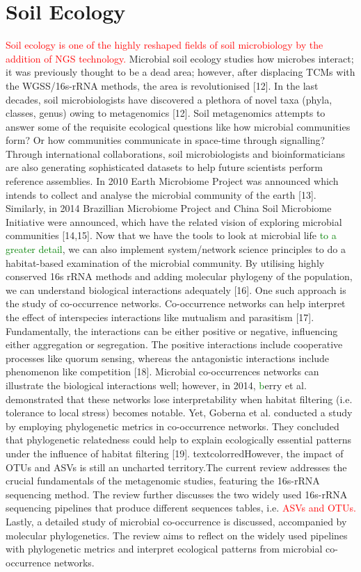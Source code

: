 \section{Soil Ecology}
\textcolor{red}{Soil ecology is one of the highly reshaped fields of soil microbiology by the addition of NGS technology.} Microbial soil ecology studies how microbes interact; it was previously thought to be a dead area; however, after displacing TCMs with the WGSS/16s-rRNA methods, the area is revolutionised [12]. In the last decades, soil microbiologists have discovered a plethora of novel taxa (phyla, classes, genus) owing to metagenomics [12]. Soil metagenomics attempts to answer some of the requisite ecological questions like how microbial communities form? Or how communities communicate in space-time through signalling? Through international collaborations, soil microbiologists and bioinformaticians are also generating sophisticated datasets to help future scientists perform reference assemblies. In 2010 Earth Microbiome Project was announced which intends to collect and analyse the microbial community of the earth [13]. Similarly, in 2014 Brazillian Microbiome Project and China Soil Microbiome Initiative were announced, which have the related vision of exploring microbial communities [14,15]. Now that we have the tools to look at microbial life \textcolor{green}{to a greater detail}, we can also implement system/network science principles to do a habitat-based examination of the microbial community. By utilising highly conserved 16s rRNA methods and adding molecular phylogeny of the population, we can understand biological interactions adequately [16]. One such approach is the study of co-occurrence networks. Co-occurrence networks can help interpret the effect of interspecies interactions like mutualism and parasitism [17]. Fundamentally, the interactions can be either positive or negative, influencing either aggregation or segregation. The positive interactions include cooperative processes like quorum sensing, whereas the antagonistic interactions include phenomenon like competition [18]. Microbial co-occurrences networks can illustrate the biological interactions well; however, in 2014, \textcolor{green}{b}erry et al. demonstrated that these networks lose interpretability when habitat filtering (i.e. tolerance to local stress) becomes notable. Yet, Goberna et al. conducted a study by employing phylogenetic metrics in co-occurrence networks. They concluded that phylogenetic relatedness could help to explain ecologically essential patterns under the influence of habitat filtering [19]. textcolor{red}{However, the impact of OTUs and ASVs is still an uncharted territory.}\newline \newline The current review addresses the crucial fundamentals of the metagenomic studies, featuring the 16s-rRNA sequencing method. The review further discusses the two widely used 16s-rRNA sequencing pipelines that produce different sequences tables, i.e. \textcolor{red}{ASVs and OTUs.} Lastly, a detailed study of microbial co-occurrence is discussed, accompanied by molecular phylogenetics. The review aims to reflect on the widely used pipelines with phylogenetic metrics and interpret ecological patterns from microbial co-occurrence networks.